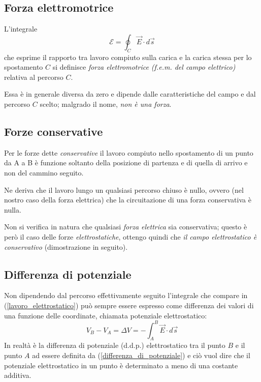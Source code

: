 \documentclass[class=book, crop=false, oneside, 12pt]{standalone}
\begin{document}
\subsection{Forza elettromotrice}

L'integrale 
\begin{equation}
    \mathcal{E} = \oint_C \overrightarrow{E} \cdot d \overrightarrow{s}
\end{equation}
che esprime il rapporto tra lavoro compiuto sulla carica e la carica stessa per lo spostamento \(C\) si definisce \emph{forza elettromotrice (f.e.m. del campo elettrico)} relativa al percorso \(C\).

Essa è in generale diversa da zero e dipende dalle caratteristiche del campo e dal percorso \(C\) scelto; malgrado il nome, \emph{non è una forza}.

\subsection{Forze conservative}
Per le forze dette \emph{conservative} il lavoro compiuto nello spostamento di un punto da A a B è funzione soltanto della posizione di partenza e di quella di arrivo e non del cammino seguito.

Ne deriva che il lavoro lungo un qualsiasi percorso chiuso è nullo, ovvero (nel nostro caso della forza elettrica) che la circuitazione di una forza conservativa è nulla.

Non si verifica in natura che qualsiasi \emph{forza elettrica} sia conservativa; questo è però il caso delle forze \emph{elettrostatiche}, ottengo quindi che \emph{il campo elettrostatico è conservativo} (dimostrazione in seguito).

\subsection*{Differenza di potenziale}

Non dipendendo dal percorso effettivamente seguito l'integrale che compare in (\ref{lavoro_elettrostatico}) può sempre essere espresso come differenza dei valori di una funzione delle coordinate, chiamata potenziale elettrostatico: 
\begin{equation} \label{differenza_di_potenziale}
    V_B - V_A = \Delta V = - \int_A^B \overrightarrow{E} \cdot d \overrightarrow{s}
\end{equation}
In realtà è la differenza di potenziale (d.d.p.) elettrostatico tra il punto \(B\) e il punto \(A\) ad essere definita da (\ref{differenza_di_potenziale}) e ciò vuol dire che il potenziale elettrostatico in un punto è determinato a meno di una costante additiva.
\end{document}
